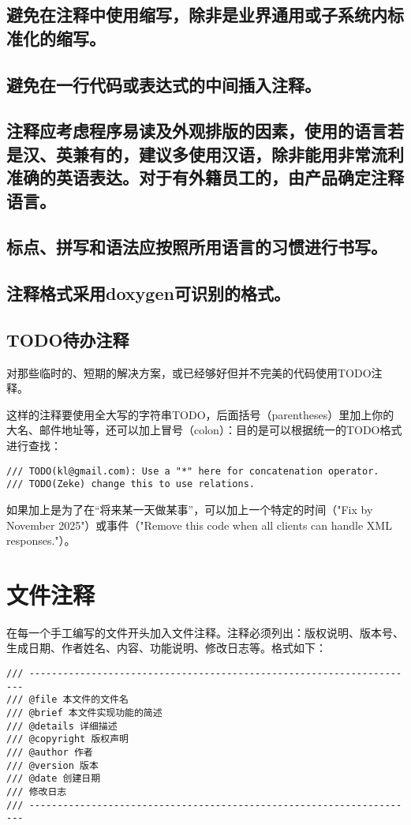 \subsection{避免在注释中使用缩写，除非是业界通用或子系统内标准化的缩写。}


\subsection{避免在一行代码或表达式的中间插入注释。}


\subsection{注释应考虑程序易读及外观排版的因素，使用的语言若是汉、英兼有的，建议多使用汉语，除非能用非常流利准确的英语表达。对于有外籍员工的，由产品确定注释语言。}


\subsection{标点、拼写和语法应按照所用语言的习惯进行书写。}


\subsection{注释格式采用doxygen可识别的格式。}


\subsection{TODO待办注释}
对那些临时的、短期的解决方案，或已经够好但并不完美的代码使用TODO注释。

这样的注释要使用全大写的字符串TODO，后面括号（parentheses）里加上你的大名、邮件地址等，还可以加上冒号（colon）：目的是可以根据统一的TODO格式进行查找：
\begin{verbatim}
/// TODO(kl@gmail.com): Use a "*" here for concatenation operator.
/// TODO(Zeke) change this to use relations.
\end{verbatim}


如果加上是为了在“将来某一天做某事”，可以加上一个特定的时间（"Fix by November 2025"）或事件（"Remove this code when all clients can handle XML responses."）。


\section{文件注释}
在每一个手工编写的文件开头加入文件注释。注释必须列出：版权说明、版本号、生成日期、作者姓名、内容、功能说明、修改日志等。格式如下：
\begin{verbatim}
/// ---------------------------------------------------------------------
/// @file 本文件的文件名
/// @brief 本文件实现功能的简述
/// @details 详细描述
/// @copyright 版权声明
/// @author 作者
/// @version 版本
/// @date 创建日期
/// 修改日志
/// ---------------------------------------------------------------------
\end{verbatim}

